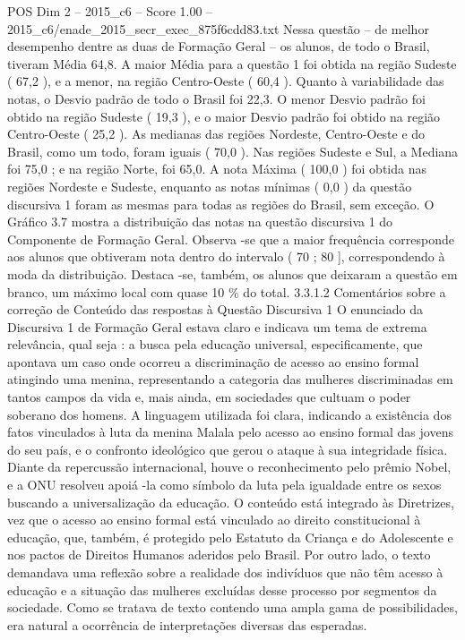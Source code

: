 \begin{textsample}{POS Dim 2 – 2015\_c6 – Score 1.00 – 2015\_c6/enade\_2015\_secr\_exec\_875f6cdd83.txt}
Nessa questão – de melhor desempenho dentre as duas de Formação Geral – os alunos, de todo o Brasil, tiveram Média 64,8.
A maior Média para a questão 1 foi obtida na região Sudeste ( 67,2 ), e a menor, na região Centro-Oeste ( 60,4 ).
Quanto à variabilidade das notas, o Desvio padrão de todo o Brasil foi 22,3.
O menor Desvio padrão foi obtido na região Sudeste ( 19,3 ), e o maior Desvio padrão foi obtido na região Centro-Oeste ( 25,2 ).
As medianas das regiões Nordeste, Centro-Oeste e do Brasil, como um todo, foram iguais ( 70,0 ).
Nas regiões Sudeste e Sul, a Mediana foi 75,0 ; e na região Norte, foi 65,0.
A nota Máxima ( 100,0 ) foi obtida nas regiões Nordeste e Sudeste, enquanto as notas mínimas ( 0,0 ) da questão discursiva 1 foram as mesmas para todas as regiões do Brasil, sem exceção.
O Gráfico 3.7 mostra a distribuição das notas na questão discursiva 1 do Componente de Formação Geral.
Observa -se que a maior frequência corresponde aos alunos que obtiveram nota dentro do intervalo ( 70 ; 80 ], correspondendo à moda da distribuição.
Destaca -se, também, os alunos que deixaram a questão em branco, um máximo local com quase 10 \% do total. 3.3.1.2 Comentários sobre a correção de Conteúdo das respostas à Questão Discursiva 1 O enunciado da Discursiva 1 de Formação Geral estava claro e indicava um tema de extrema relevância, qual seja : a busca pela educação universal, especificamente, que apontava um caso onde ocorreu a discriminação de acesso ao ensino formal atingindo uma menina, representando a categoria das mulheres discriminadas em tantos campos da vida e, mais ainda, em sociedades que cultuam o poder soberano dos homens.
A linguagem utilizada foi clara, indicando a existência dos fatos vinculados à luta da menina Malala pelo acesso ao ensino formal das jovens do seu país, e o confronto ideológico que gerou o ataque à sua integridade física.
Diante da repercussão internacional, houve o reconhecimento pelo prêmio Nobel, e a ONU resolveu apoiá -la como símbolo da luta pela igualdade entre os sexos buscando a universalização da educação.
O conteúdo está integrado às Diretrizes, vez que o acesso ao ensino formal está vinculado ao direito constitucional à educação, que, também, é protegido pelo Estatuto da Criança e do Adolescente e nos pactos de Direitos Humanos aderidos pelo Brasil.
Por outro lado, o texto demandava uma reflexão sobre a realidade dos indivíduos que não têm acesso à educação e a situação das mulheres excluídas desse processo por segmentos da sociedade.
Como se tratava de texto contendo uma ampla gama de possibilidades, era natural a ocorrência de interpretações diversas das esperadas.

\end{textsample}
